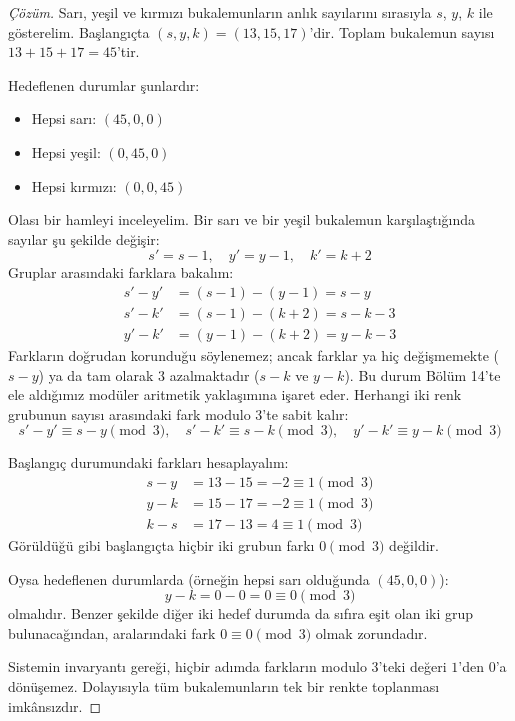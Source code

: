 \begin{proof}[Çözüm]
Sarı, yeşil ve kırmızı bukalemunların anlık sayılarını sırasıyla $s$, $y$, $k$ ile gösterelim. Başlangıçta $(s, y, k) = (13, 15, 17)$'dir. Toplam bukalemun sayısı $13 + 15 + 17 = 45$'tir. 

Hedeflenen durumlar şunlardır:
\begin{itemize}
    \item Hepsi sarı: $(45, 0, 0)$
    \item Hepsi yeşil: $(0, 45, 0)$
    \item Hepsi kırmızı: $(0, 0, 45)$
\end{itemize}

Olası bir hamleyi inceleyelim. Bir sarı ve bir yeşil bukalemun karşılaştığında sayılar şu şekilde değişir:
\[
s' = s - 1, \quad y' = y - 1, \quad k' = k + 2
\]
Gruplar arasındaki farklara bakalım:
\begin{align*}
s' - y' &= (s - 1) - (y - 1) = s - y \\
s' - k' &= (s - 1) - (k + 2) = s - k - 3 \\
y' - k' &= (y - 1) - (k + 2) = y - k - 3
\end{align*}
Farkların doğrudan korunduğu söylenemez; ancak farklar ya hiç değişmemekte ($s - y$) ya da tam olarak $3$ azalmaktadır ($s - k$ ve $y - k$). Bu durum Bölüm 14'te ele aldığımız modüler aritmetik yaklaşımına işaret eder. Herhangi iki renk grubunun sayısı arasındaki fark modulo 3'te sabit kalır:
\[
s' - y' \equiv s - y \pmod 3, \quad s' - k' \equiv s - k \pmod 3, \quad y' - k' \equiv y - k \pmod 3
\]

Başlangıç durumundaki farkları hesaplayalım:
\begin{align*}
s - y &= 13 - 15 = -2 \equiv 1 \pmod 3 \\
y - k &= 15 - 17 = -2 \equiv 1 \pmod 3 \\
k - s &= 17 - 13 = 4 \equiv 1 \pmod 3
\end{align*}
Görüldüğü gibi başlangıçta hiçbir iki grubun farkı $0 \pmod 3$ değildir.

Oysa hedeflenen durumlarda (örneğin hepsi sarı olduğunda $(45, 0, 0)$):
\[
y - k = 0 - 0 = 0 \equiv 0 \pmod 3
\]
olmalıdır. Benzer şekilde diğer iki hedef durumda da sıfıra eşit olan iki grup bulunacağından, aralarındaki fark $0 \equiv 0 \pmod 3$ olmak zorundadır.

Sistemin invaryantı gereği, hiçbir adımda farkların modulo 3'teki değeri $1$'den $0$'a dönüşemez. Dolayısıyla tüm bukalemunların tek bir renkte toplanması imkânsızdır.
\end{proof}

